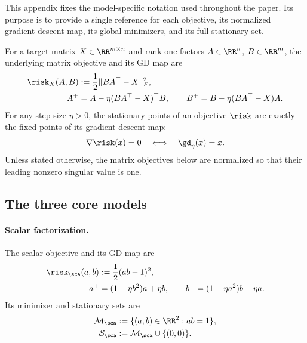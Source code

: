 \documentclass{article}
\begin{document}
This appendix fixes the model-specific notation used throughout the paper. Its
purpose is to provide a single reference for each objective, its normalized
gradient-descent map, its global minimizers, and its full stationary set.

For a target matrix $X\in\RR^{m\times n}$ and rank-one factors
$A\in\RR^n$, $B\in\RR^m$, the underlying matrix objective and its GD map are
\begin{align}
    \risk_X(A,B)
    &:=\frac12\|BA^\top-X\|_F^2,
    \label{eq:model_catalog_general_loss}\\
    A^+&=A-\eta(BA^\top-X)^\top B,
    \qquad
    B^+=B-\eta(BA^\top-X)A.
    \label{eq:model_catalog_general_gd}
\end{align}
For any step size $\eta>0$, the stationary points of an objective $\risk$ are
exactly the fixed points of its gradient-descent map:
\begin{align}
    \nabla\risk(x)=0
    \quad\Longleftrightarrow\quad
    \gd_\eta(x)=x.
    \label{eq:stationary_fixed_equivalence}
\end{align}
Unless stated otherwise, the matrix objectives below are normalized so that
their leading nonzero singular value is one.

\subsection{The three core models}
\label{subsec:model_catalog_core}

\paragraph{Scalar factorization.}
The scalar objective and its GD map are
\begin{align}
    \risk_\sca(a,b)
    &:=\frac12(ab-1)^2,
    \label{eq:model_catalog_scalar_loss}\\
    a^+&=(1-\eta b^2)a+\eta b,
    \qquad
    b^+=(1-\eta a^2)b+\eta a.
    \label{eq:model_catalog_scalar_gd}
\end{align}
Its minimizer and stationary sets are
\begin{align}
    \mathcal M_\sca
    &:=\{(a,b)\in\RR^2:ab=1\},\\
    \mathcal S_\sca
    &:=\mathcal M_\sca\cup\{(0,0)\}.
    \label{eq:model_catalog_scalar_sets}
\end{align}
\end{document}
